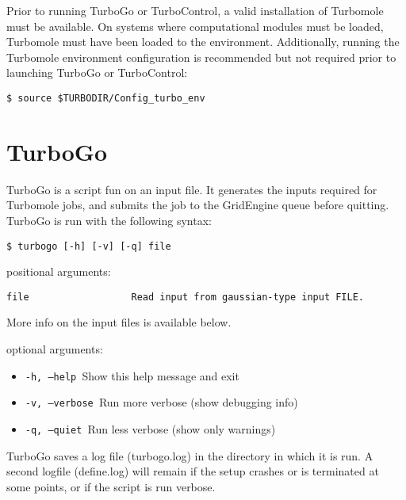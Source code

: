 Prior to running TurboGo or TurboControl, a valid installation of
Turbomole must be available. On systems where computational modules must
be loaded, Turbomole must have been loaded to the environment.
Additionally, running the Turbomole environment configuration is
recommended but not required prior to launching TurboGo or TurboControl:

\begin{center}
\begin{verbatim}
$ source $TURBODIR/Config_turbo_env
\end{verbatim}
\end{center}

\section{TurboGo}

TurboGo is a script fun on an input file. It generates the inputs
required for Turbomole jobs, and submits the job to the GridEngine queue
before quitting. TurboGo is run with the following syntax:

\begin{center}
\begin{verbatim}
$ turbogo [-h] [-v] [-q] file
\end{verbatim}
\end{center}

positional arguments:

\begin{Verbatim}[baselinestretch=0.75]
file                  Read input from gaussian-type input FILE.
\end{Verbatim}

More info on the input files is available below.

optional arguments:

\begin{itemize}
\item \texttt{-h, --help            }Show this help message and exit
\item \texttt{-v, --verbose         }Run more verbose (show debugging info)
\item \texttt{-q, --quiet           }Run less verbose (show only warnings)
\end{itemize}

TurboGo saves a log file (turbogo.log) in the directory in which it is
run. A second logfile (define.log) will remain if the setup crashes or
is terminated at some points, or if the script is run verbose.

